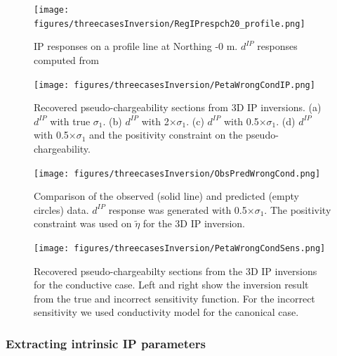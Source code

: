 \documentclass[a4paper, 11pt]{article}
\newcommand{\siginf}{\sigma_\infty}
\newcommand{\peta}{\tilde{\eta}}
\newcommand{\dip}{d^{IP}}
\begin{document}
\begin{figure}[htb]
  \centering \texttt{[image: figures/threecasesInversion/RegIPrespch20\_profile.png]}
  \caption{IP responses on a profile line at Northing -0 m. $\dip$ responses computed from }
  \label{F:ObsRegIPrespch20_profilePredDepth}
\end{figure}

\begin{figure}[htb]
  \centering \texttt{[image: figures/threecasesInversion/PetaWrongCondIP.png]}
  \caption{Recovered pseudo-chargeability sections from 3D IP inversions. (a) $\dip$ with true $\sigma_1$. (b) $\dip$ with 2$\times \sigma_1$. (c) $\dip$ with 0.5$\times \sigma_1$. (d) $\dip$ with 0.5$\times \sigma_1$ and the positivity constraint on the pseudo-chargeability.}
  \label{F:PetaWrongCondIP}
\end{figure}

\begin{figure}[htb]
  \centering \texttt{[image: figures/threecasesInversion/ObsPredWrongCond.png]}
  \caption{Comparison of the observed (solid line) and predicted (empty circles) data. $\dip$ response was generated with 0.5$\times \sigma_1$. The positivity constraint was used on $\peta$ for the 3D IP inversion.}
  \label{F:ObsPredWrongCond}
\end{figure}

\begin{figure}[htb]
  \centering \texttt{[image: figures/threecasesInversion/PetaWrongCondSens.png]}
  \caption{Recovered pseudo-chargeabilty sections from the 3D IP inversions for the conductive case. Left and right show the inversion result from the true and incorrect sensitivity function. For the incorrect sensitivity we used conductivity model for the canonical case. }
  \label{F:PetaWrongCondSens}
\end{figure}
\clearpage


\subsubsection{Extracting intrinsic IP parameters}
\end{document}
